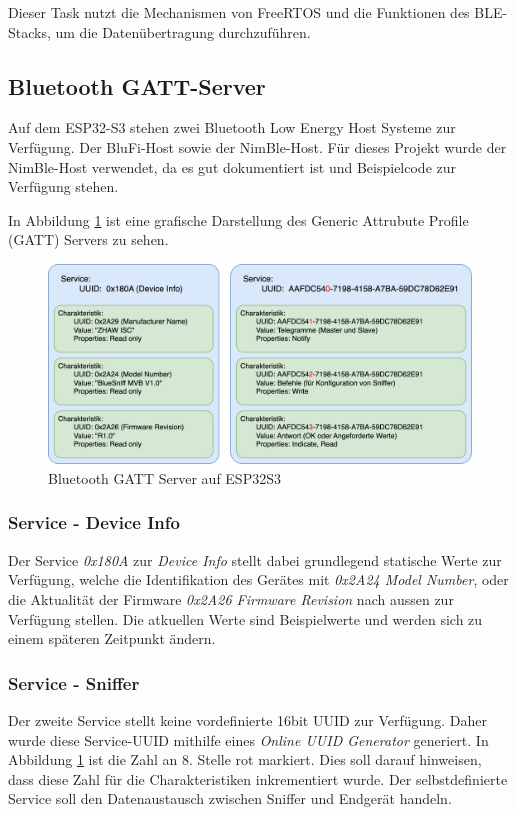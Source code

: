 Dieser Task nutzt die Mechanismen von FreeRTOS und die Funktionen des BLE-Stacks, um die Datenübertragung durchzuführen.



\subsection{Bluetooth GATT-Server}
\label{sub:BluetoothGATT}
Auf dem ESP32-S3 stehen zwei Bluetooth Low Energy Host Systeme zur Verfügung. Der BluFi-Host sowie der NimBle-Host\cite{BLUETOOTH_API}. Für dieses Projekt wurde der NimBle-Host verwendet, da es gut dokumentiert ist und Beispielcode zur Verfügung stehen.

In Abbildung \ref{fig:BLEGATT} ist eine grafische Darstellung des Generic Attrubute Profile (GATT) Servers zu sehen.

\begin{figure}[H]
    \centering
    \includegraphics[width=0.9\linewidth]{Figures/Chap3/ESP/BLE/BLE.png}
    \caption{Bluetooth GATT Server auf ESP32S3}
    \label{fig:BLEGATT}
\end{figure}

\subsubsection{Service - Device Info}
Der Service \textit{0x180A} zur \textit{Device Info} stellt dabei grundlegend statische Werte zur Verfügung, welche die Identifikation des Gerätes mit \textit{0x2A24 Model Number}, oder die Aktualität der Firmware \textit{0x2A26 Firmware Revision} nach aussen zur Verfügung stellen. Die atkuellen Werte sind Beispielwerte und werden sich zu einem späteren Zeitpunkt ändern. 

\subsubsection{Service - Sniffer}
Der zweite Service stellt keine vordefinierte 16bit UUID zur Verfügung. Daher wurde diese Service-UUID mithilfe eines \textit{Online UUID Generator} generiert. In Abbildung \ref{fig:BLEGATT} ist die Zahl an 8. Stelle rot markiert. Dies soll darauf hinweisen, dass diese Zahl für die Charakteristiken inkrementiert wurde. Der selbstdefinierte Service soll den Datenaustausch zwischen Sniffer und Endgerät handeln. 

